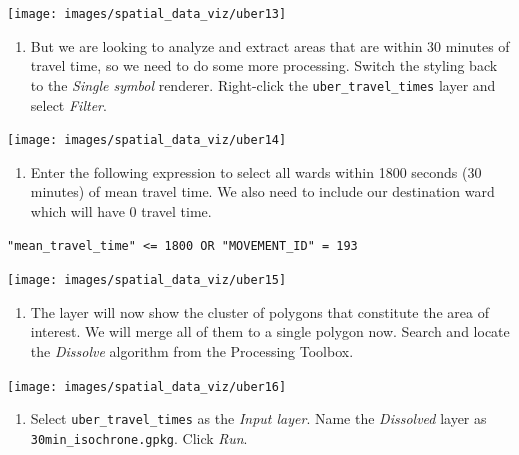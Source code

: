 \documentclass[
  12pt,
  a4paper]{article}
\providecommand{\tightlist}{%
  \setlength{\itemsep}{0pt}\setlength{\parskip}{0pt}}
\begin{document}
\begin{center}\texttt{[image: images/spatial\_data\_viz/uber13]} \end{center}

\begin{enumerate}
\def\labelenumi{\arabic{enumi}.}
\setcounter{enumi}{13}
\tightlist
\item
  But we are looking to analyze and extract areas that are within 30
  minutes of travel time, so we need to do some more processing. Switch
  the styling back to the \emph{Single symbol} renderer. Right-click the
  \texttt{uber\_travel\_times} layer and select \emph{Filter}.
\end{enumerate}

\begin{center}\texttt{[image: images/spatial\_data\_viz/uber14]} \end{center}

\begin{enumerate}
\def\labelenumi{\arabic{enumi}.}
\setcounter{enumi}{14}
\tightlist
\item
  Enter the following expression to select all wards within 1800 seconds
  (30 minutes) of mean travel time. We also need to include our
  destination ward which will have 0 travel time.
\end{enumerate}

\begin{verbatim}
"mean_travel_time" <= 1800 OR "MOVEMENT_ID" = 193
\end{verbatim}

\begin{center}\texttt{[image: images/spatial\_data\_viz/uber15]} \end{center}

\begin{enumerate}
\def\labelenumi{\arabic{enumi}.}
\setcounter{enumi}{15}
\tightlist
\item
  The layer will now show the cluster of polygons that constitute the
  area of interest. We will merge all of them to a single polygon now.
  Search and locate the \emph{Dissolve} algorithm from the Processing
  Toolbox.
\end{enumerate}

\begin{center}\texttt{[image: images/spatial\_data\_viz/uber16]} \end{center}

\begin{enumerate}
\def\labelenumi{\arabic{enumi}.}
\setcounter{enumi}{16}
\tightlist
\item
  Select \texttt{uber\_travel\_times} as the \emph{Input layer}. Name
  the \emph{Dissolved} layer as \texttt{30min\_isochrone.gpkg}. Click
  \emph{Run}.
\end{enumerate}
\end{document}
